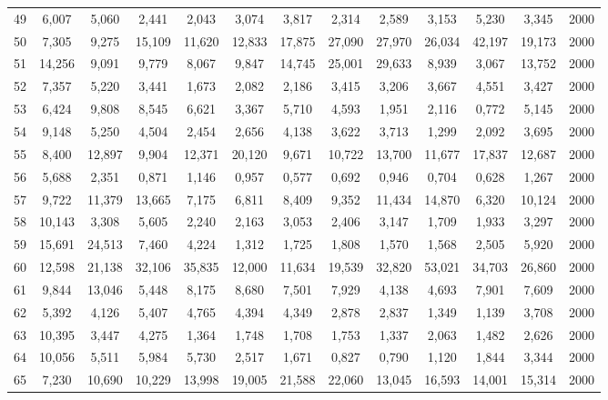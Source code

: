 {\begin{longtable}{ >{\footnotesize}ccccccccccccc}
49  & 6,007  & 5,060  & 2,441  & 2,043  & 3,074  & 3,817  & 2,314  & 2,589  & 3,153  & 5,230  & 3,345  & 2000 \\
50  & 7,305  & 9,275  & 15,109 & 11,620 & 12,833 & 17,875 & 27,090 & 27,970 & 26,034 & 42,197 & 19,173 & 2000 \\
51  & 14,256 & 9,091  & 9,779  & 8,067  & 9,847  & 14,745 & 25,001 & 29,633 & 8,939  & 3,067  & 13,752 & 2000 \\
52  & 7,357  & 5,220  & 3,441  & 1,673  & 2,082  & 2,186  & 3,415  & 3,206  & 3,667  & 4,551  & 3,427  & 2000 \\
53  & 6,424  & 9,808  & 8,545  & 6,621  & 3,367  & 5,710  & 4,593  & 1,951  & 2,116  & 0,772  & 5,145  & 2000 \\
54  & 9,148  & 5,250  & 4,504  & 2,454  & 2,656  & 4,138  & 3,622  & 3,713  & 1,299  & 2,092  & 3,695  & 2000 \\
55  & 8,400  & 12,897 & 9,904  & 12,371 & 20,120 & 9,671  & 10,722 & 13,700 & 11,677 & 17,837 & 12,687 & 2000 \\
56  & 5,688  & 2,351  & 0,871  & 1,146  & 0,957  & 0,577  & 0,692  & 0,946  & 0,704  & 0,628  & 1,267  & 2000 \\
57  & 9,722  & 11,379 & 13,665 & 7,175  & 6,811  & 8,409  & 9,352  & 11,434 & 14,870 & 6,320  & 10,124 & 2000 \\
58  & 10,143 & 3,308  & 5,605  & 2,240  & 2,163  & 3,053  & 2,406  & 3,147  & 1,709  & 1,933  & 3,297  & 2000 \\
59  & 15,691 & 24,513 & 7,460  & 4,224  & 1,312  & 1,725  & 1,808  & 1,570  & 1,568  & 2,505  & 5,920  & 2000 \\
60  & 12,598 & 21,138 & 32,106 & 35,835 & 12,000 & 11,634 & 19,539 & 32,820 & 53,021 & 34,703 & 26,860 & 2000 \\
61  & 9,844  & 13,046 & 5,448  & 8,175  & 8,680  & 7,501  & 7,929  & 4,138  & 4,693  & 7,901  & 7,609  & 2000 \\
62  & 5,392  & 4,126  & 5,407  & 4,765  & 4,394  & 4,349  & 2,878  & 2,837  & 1,349  & 1,139  & 3,708  & 2000 \\
63  & 10,395 & 3,447  & 4,275  & 1,364  & 1,748  & 1,708  & 1,753  & 1,337  & 2,063  & 1,482  & 2,626  & 2000 \\
64  & 10,056 & 5,511  & 5,984  & 5,730  & 2,517  & 1,671  & 0,827  & 0,790  & 1,120  & 1,844  & 3,344  & 2000 \\
65  & 7,230  & 10,690 & 10,229 & 13,998 & 19,005 & 21,588 & 22,060 & 13,045 & 16,593 & 14,001 & 15,314 & 2000 \\

\end{longtable}}

